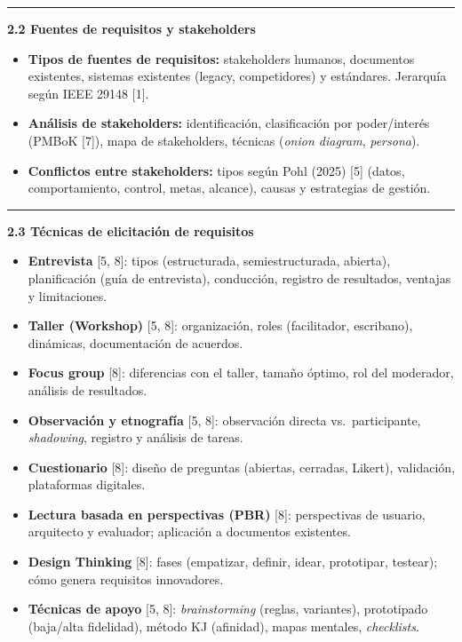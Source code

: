 \documentclass[11pt,a4paper]{article}
\newcommand{\submark}[1]{\par\vspace{4pt}\noindent
  {\color{secblue}\rule[-1pt]{3.5pt}{12pt}}\hspace{6pt}\textbf{\color{secdark}#1}\par\vspace{2pt}}
\begin{document}
\submark{2.2 Fuentes de requisitos y stakeholders}
\begin{itemize}
\item \textbf{Tipos de fuentes de requisitos:} stakeholders humanos, documentos existentes, sistemas existentes (legacy, competidores) y estándares. Jerarquía según IEEE 29148 [1].
\item \textbf{Análisis de stakeholders:} identificación, clasificación por poder/interés (PMBoK [7]), mapa de stakeholders, técnicas (\textit{onion diagram}, \textit{persona}).
\item \textbf{Conflictos entre stakeholders:} tipos según Pohl (2025) [5] (datos, comportamiento, control, metas, alcance), causas y estrategias de gestión.
\end{itemize}

\submark{2.3 Técnicas de elicitación de requisitos}
\begin{itemize}
\item \textbf{Entrevista} [5, 8]: tipos (estructurada, semiestructurada, abierta), planificación (guía de entrevista), conducción, registro de resultados, ventajas y limitaciones.
\item \textbf{Taller (Workshop)} [5, 8]: organización, roles (facilitador, escribano), dinámicas, documentación de acuerdos.
\item \textbf{Focus group} [8]: diferencias con el taller, tamaño óptimo, rol del moderador, análisis de resultados.
\item \textbf{Observación y etnografía} [5, 8]: observación directa vs.\ participante, \textit{shadowing}, registro y análisis de tareas.
\item \textbf{Cuestionario} [8]: diseño de preguntas (abiertas, cerradas, Likert), validación, plataformas digitales.
\item \textbf{Lectura basada en perspectivas (PBR)} [8]: perspectivas de usuario, arquitecto y evaluador; aplicación a documentos existentes.
\item \textbf{Design Thinking} [8]: fases (empatizar, definir, idear, prototipar, testear); cómo genera requisitos innovadores.
\item \textbf{Técnicas de apoyo} [5, 8]: \textit{brainstorming} (reglas, variantes), prototipado (baja/alta fidelidad), método KJ (afinidad), mapas mentales, \textit{checklists}.
\end{itemize}
\end{document}
